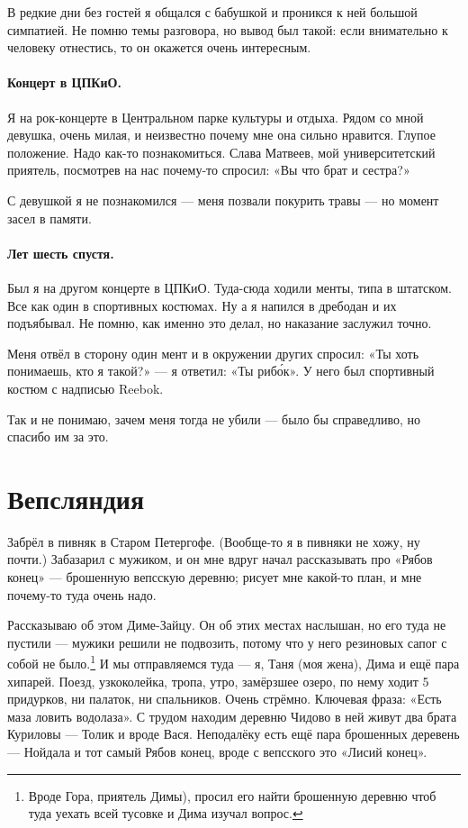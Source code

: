 \documentclass{book}
\begin{document}
В редкие дни без гостей я общался с бабушкой и проникся к ней большой симпатией.
Не помню темы разговора, но вывод был такой: если внимательно к человеку отнестись, то он окажется очень интересным.

\paragraph{Концерт в ЦПКиО.}
Я на рок-концерте в Центральном парке культуры и отдыха.
Рядом со мной девушка, очень милая, и неизвестно почему мне она сильно нравится.
Глупое положение.
Надо как-то познакомиться.
Слава Матвеев, мой университетский приятель, посмотрев на нас почему-то спросил: «Вы что брат и сестра?»

С девушкой я не познакомился --- меня позвали покурить травы --- но момент засел в памяти.

\paragraph{Лет шесть спустя.}
Был я на другом концерте в ЦПКиО.
Туда-сюда ходили менты, типа в штатском.
Все как один в спортивных костюмах.
Ну а я напился в дребодан и их подъябывал.
Не помню, как именно это делал, но наказание заслужил точно.

Меня отвёл в сторону один мент и в окружении других спросил:
«Ты хоть понимаешь, кто я такой?» --- я ответил: «Ты риб\'{о}к». 
У него был спортивный костюм с надписью Reebok.

Так и не понимаю, зачем меня тогда не убили --- было бы справедливо, но спасибо им за это. 


\section*{Вепсляндия}

Забрёл в пивняк в Старом Петергофе.
(Вообще-то я в пивняки не хожу, ну почти.)
Забазарил с мужиком, и он мне вдруг начал рассказывать про «Рябов конец» --- брошенную вепсскую деревню; рисует мне какой-то план, и мне почему-то туда очень надо.

Рассказываю об этом Диме-Зайцу.
Он об этих местах наслышан, но его туда не пустили --- мужики решили не подвозить, потому что у него резиновых сапог с собой не было.\footnote{Вроде Гора, приятель Димы), просил его найти брошенную деревню чтоб туда уехать всей тусовке и Дима изучал вопрос.}
И мы отправляемся туда --- я, Таня (моя жена), Дима и ещё пара хипарей.
Поезд, узкоколейка, тропа, утро, замёрзшее озеро, по нему ходит 5 придурков,
ни палаток, ни спальников.
Очень стрёмно.
Ключевая фраза: «Есть маза ловить водолаза».
С трудом находим деревню Чидово в ней живут два брата Куриловы --- Толик и вроде Вася.
Неподалёку есть ещё пара брошенных деревень --- Нойдала и тот самый Рябов конец,
вроде с вепсского это «Лисий конец».
\end{document}
